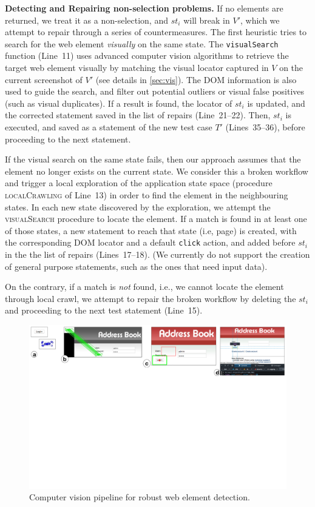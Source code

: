 

\noindent
\textbf{Detecting and Repairing non-selection problems.}
If no elements are returned, we treat it as a non-selection, and $st_i$ will break in $V'$, which we attempt to repair through a series of countermeasures. The first heuristic tries to search for the web element \textit{visually} on the same state. The \texttt{visualSearch} function (Line~11) uses advanced computer vision algorithms to retrieve the target web element visually by matching the visual locator captured in $V$ on the current screenshot of $V'$ (see details in \autoref{sec:vis}). The DOM information is also used to guide the search, and filter out potential outliers or visual false positives (such as visual duplicates). If a result is found, the locator of $st_i$ is updated, and the corrected statement saved in the list of repairs (Line~21--22). Then, $st_i$ is executed, and saved as a statement of the new test case $T'$ (Lines~35--36), before proceeding to the next statement.

If the visual search on the same state fails, then our approach assumes that the element no longer exists on the current state. We consider this a broken workflow and trigger a local exploration of the application state space (procedure \textsc{localCrawling} of Line~13) in order to find the element in the neighbouring states. In each new state discovered by the exploration, we attempt the \textsc{visualSearch} procedure to locate the element. If a match is found in at least one of those states, a new statement to reach that state (i.e, page) is created, with the corresponding DOM locator and a default \texttt{click} action, and added before $st_i$ in the the list of repairs (Lines~17--18). (We currently do not support the creation of general purpose statements, such as the ones that need input data).

On the contrary, if a match is \textit{not} found, i.e., we cannot locate the element through local crawl, we attempt to repair the broken workflow by deleting the $st_i$ and proceeding to the next test statement (Line~15).

\begin{figure}[t]
\centering
\includegraphics[trim={0.3cm 17cm 0.4cm 0.3cm},clip,scale=0.44]{images/cv}
\caption{Computer vision pipeline for robust web element detection.}
\label{fig:cv}
\end{figure}

